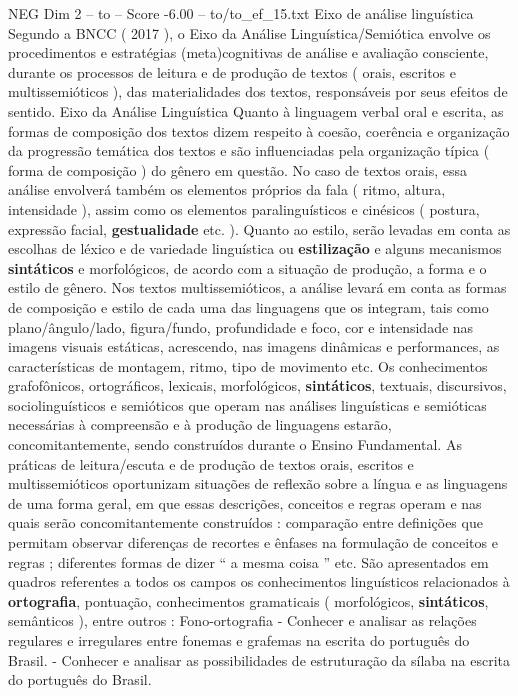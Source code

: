 \begin{textsample}{NEG Dim 2 – to – Score -6.00 – to/to\_ef\_15.txt}  \label{ex:f2_neg_154}
Eixo de análise linguística Segundo a BNCC ( 2017 ), o Eixo da Análise Linguística/Semiótica envolve os procedimentos e estratégias (meta)cognitivas de análise e avaliação consciente, durante os processos de leitura e de produção de textos ( orais, escritos e multissemióticos ), das materialidades dos textos, responsáveis por seus efeitos de sentido.
Eixo da Análise Linguística Quanto à linguagem verbal oral e escrita, as formas de composição dos textos dizem respeito à coesão, coerência e organização da progressão temática dos textos e são influenciadas pela organização típica ( forma de composição ) do gênero em questão.
No caso de textos orais, essa análise envolverá também os elementos próprios da fala ( ritmo, altura, intensidade ), assim como os elementos paralinguísticos e cinésicos ( postura, expressão facial, \textbf{gestualidade} etc. ).
Quanto ao estilo, serão levadas em conta as escolhas de léxico e de variedade linguística ou \textbf{estilização} e alguns mecanismos \textbf{sintáticos} e morfológicos, de acordo com a situação de produção, a forma e o estilo de gênero.
Nos textos multissemióticos, a análise levará em conta as formas de composição e estilo de cada uma das linguagens que os integram, tais como plano/ângulo/lado, figura/fundo, profundidade e foco, cor e intensidade nas imagens visuais estáticas, acrescendo, nas imagens dinâmicas e performances, as características de montagem, ritmo, tipo de movimento etc.
Os conhecimentos grafofônicos, ortográficos, lexicais, morfológicos, \textbf{sintáticos}, textuais, discursivos, sociolinguísticos e semióticos que operam nas análises linguísticas e semióticas necessárias à compreensão e à produção de linguagens estarão, concomitantemente, sendo construídos durante o Ensino Fundamental.
As práticas de leitura/escuta e de produção de textos orais, escritos e multissemióticos oportunizam situações de reflexão sobre a língua e as linguagens de uma forma geral, em que essas descrições, conceitos e regras operam e nas quais serão concomitantemente construídos : comparação entre definições que permitam observar diferenças de recortes e ênfases na formulação de conceitos e regras ; diferentes formas de dizer “ a mesma coisa ” etc.
São apresentados em quadros referentes a todos os campos os conhecimentos linguísticos relacionados à \textbf{ortografia}, pontuação, conhecimentos gramaticais ( morfológicos, \textbf{sintáticos}, semânticos ), entre outros : Fono-ortografia - Conhecer e analisar as relações regulares e irregulares entre fonemas e grafemas na escrita do português do Brasil. - Conhecer e analisar as possibilidades de estruturação da sílaba na escrita do português do Brasil.

\end{textsample}
